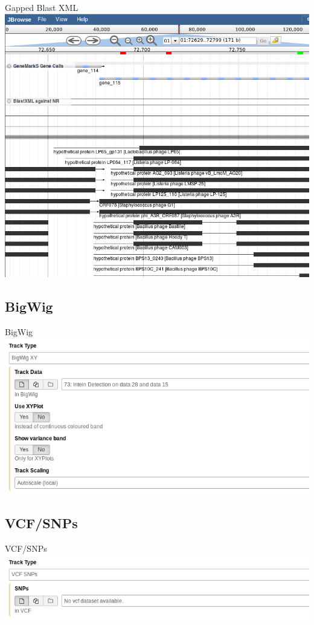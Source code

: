 \documentclass[12pt]{beamer} %
\begin{document}
\begin{frame}{Gapped Blast XML}
	\centering
	\includegraphics[width=\textwidth,height=0.8\textheight,keepaspectratio]{jb-blast.png}
\end{frame}

\subsection{BigWig}
\begin{frame}{BigWig}
	\centering
	\includegraphics[width=\textwidth,height=0.8\textheight,keepaspectratio]{snapshot15.png}
\end{frame}

\subsection{VCF/SNPs}
\begin{frame}{VCF/SNPs}
	\centering
	\includegraphics[width=\textwidth,height=0.8\textheight,keepaspectratio]{snapshot16.png}
\end{frame}
\end{document}
